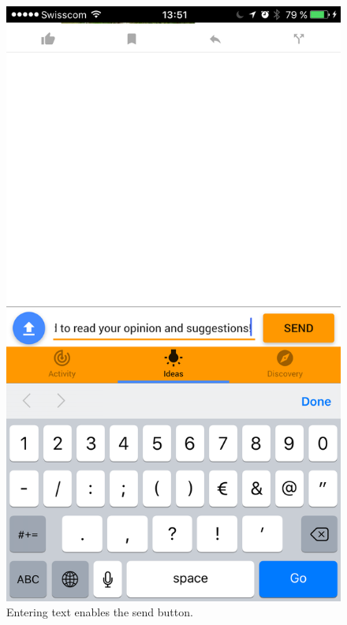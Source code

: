 \documentclass[a4paper,12pt,twoside]{article}
\begin{document}
\begin{figure}[!htb]
\begin{minipage}[t]{.32\textwidth}
        \centering
        \includegraphics[width=\textwidth]{images/flow_addComment_2.png}
        \caption{Entering text enables the send button.}
    \end{minipage}
    \hfill
    \begin{minipage}[t]{.32\textwidth}
        \centering

\end{minipage}
\end{figure}
\end{document}
